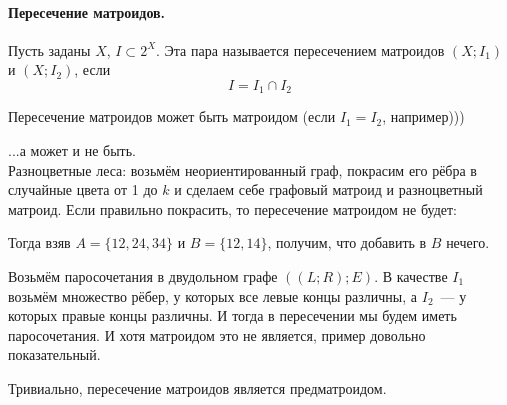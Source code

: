 \documentclass{article}
\begin{document}
    \paragraph{Пересечение матроидов.}
    \begin{definition}
        Пусть заданы $X$, $I\subset 2^X$. Эта пара называется пересечением матроидов $(X;I_1)$ и $(X;I_2)$, если
        $$
        I=I_1\cap I_2
        $$
    \end{definition}
    \begin{example}
        Пересечение матроидов может быть матроидом (если $I_1=I_2$, например)))
    \end{example}
    \begin{example}
        ...а может и не быть.\\
        Разноцветные леса: возьмём неориентированный граф, покрасим его рёбра в случайные цвета от 1 до $k$ и сделаем себе графовый матроид и разноцветный матроид. Если правильно покрасить, то пересечение матроидом не будет:
        \begin{figure}[H]
        \end{figure}\noindent
        Тогда взяв $A=\{12,24,34\}$ и $B=\{12,14\}$, получим, что добавить в $B$ нечего.
    \end{example}
    \begin{example}
        Возьмём паросочетания в двудольном графе $((L;R);E)$. В качестве $I_1$ возьмём множество рёбер, у которых все левые концы различны, а $I_2$~--- у которых правые концы различны. И тогда в пересечении мы будем иметь паросочетания. И хотя матроидом это не является, пример довольно показательный.
    \end{example}
    \begin{property}
        Тривиально, пересечение матроидов является предматроидом.
    \end{property}
\end{document}

